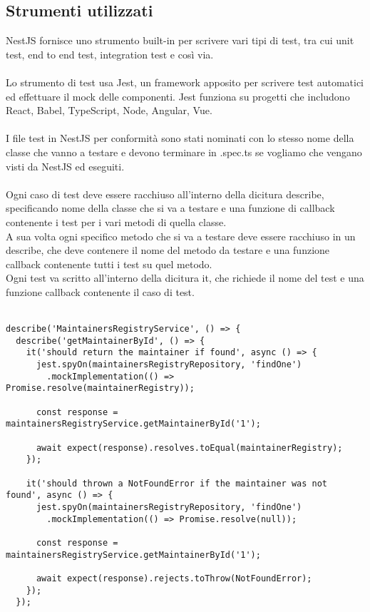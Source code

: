 \subsection{Strumenti utilizzati}
NestJS fornisce uno strumento built-in per scrivere vari tipi di test, tra cui unit test, 
end to end test, integration test e così via. 
\\\\
Lo strumento di test usa Jest, un framework apposito per scrivere test automatici ed effettuare 
il mock delle componenti. Jest funziona su progetti che includono  React, Babel, TypeScript, Node,
Angular, Vue.
\\\\
I file test in NestJS per conformità sono stati nominati con lo stesso nome della classe che vanno
a testare e devono terminare in .spec.ts se vogliamo che vengano visti da NestJS ed eseguiti.
\\\\
Ogni caso di test deve essere racchiuso all'interno della dicitura describe, specificando nome della
classe che si va a testare e una funzione di callback contenente i test per i vari metodi di quella classe.
\\
A sua volta ogni specifico metodo che si va a testare deve essere racchiuso in un describe, che deve
contenere il nome del metodo da testare e una funzione callback contenente tutti i test su quel metodo.
\\
Ogni test va scritto all'interno della dicitura it, che richiede il nome del test e una funzione callback
contenente il caso di test.
\\\\
\begin{lstlisting}
describe('MaintainersRegistryService', () => {
  describe('getMaintainerById', () => {
    it('should return the maintainer if found', async () => {
      jest.spyOn(maintainersRegistryRepository, 'findOne')
        .mockImplementation(() => Promise.resolve(maintainerRegistry));

      const response = maintainersRegistryService.getMaintainerById('1');

      await expect(response).resolves.toEqual(maintainerRegistry);
    });

    it('should thrown a NotFoundError if the maintainer was not found', async () => {
      jest.spyOn(maintainersRegistryRepository, 'findOne')
        .mockImplementation(() => Promise.resolve(null));

      const response = maintainersRegistryService.getMaintainerById('1');

      await expect(response).rejects.toThrow(NotFoundError);
    });
  });
\end{lstlisting}

